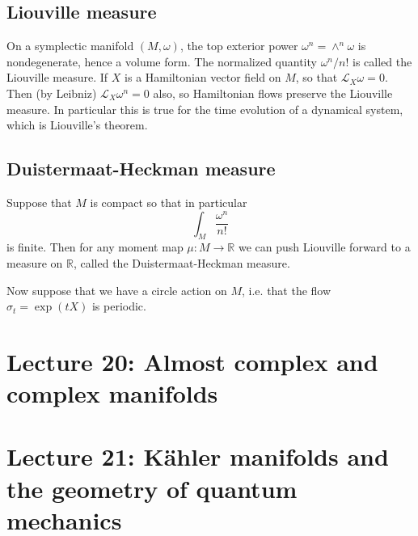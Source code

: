 \documentclass[11pt]{article} %
\begin{document}
\subsection*{Liouville measure}
On a symplectic manifold $(M, \omega)$, the top exterior power $\omega^n = \wedge^n \omega$ is nondegenerate, hence a volume form. The normalized quantity $\omega^n/n!$ is called the Liouville measure. If $X$ is a Hamiltonian vector field on $M$, so that $\mathscr{L}_X \omega = 0$. Then (by Leibniz) $\mathscr{L}_X \omega^n = 0$ also, so Hamiltonian flows preserve the Liouville measure. In particular this is true for the time evolution of a dynamical system, which is Liouville's theorem. 
\subsection*{Duistermaat-Heckman measure}
Suppose that $M$ is compact so that in particular 
$$
\int_M \frac{\omega^n}{n!} 
$$
is finite. Then for any moment map $\mu:M \rightarrow \mathbb{R}$ we can push Liouville forward to a measure on $\mathbb{R}$, called the Duistermaat-Heckman measure. 

Now suppose that we have a circle action on $M$, i.e. that the flow $\sigma_t = \operatorname{exp}(tX)$ is periodic. 


\section*{Lecture 20: Almost complex and complex manifolds}

\section*{Lecture 21: Kähler manifolds and the geometry of quantum mechanics}
\end{document}
